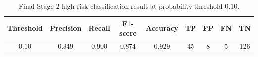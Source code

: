 \begin{table}[htbp]
\centering
\caption{Final Stage 2 high-risk classification result at probability threshold 0.10.}
\label{tab:stage2-classification-metrics}
\begin{tabularx}{\textwidth}{c c c c c c c c c}
\toprule
Threshold & Precision & Recall & F1-score & Accuracy & TP & FP & FN & TN \\
\midrule
0.10 & 0.849 & 0.900 & 0.874 & 0.929 & 45 & 8 & 5 & 126 \\
\bottomrule
\end{tabularx}
\end{table}

